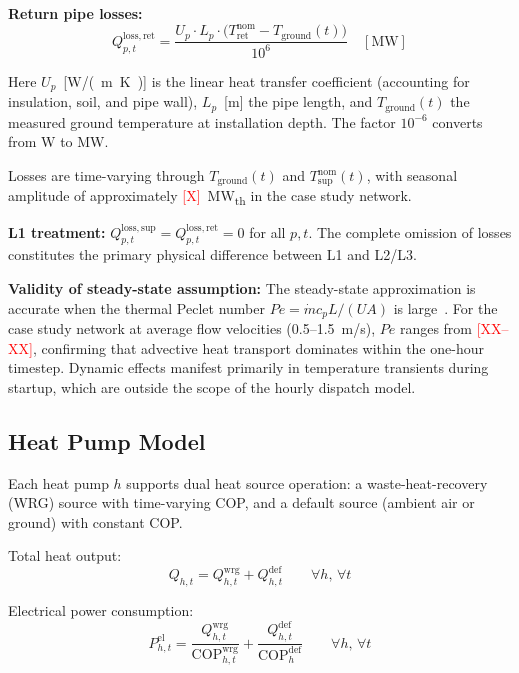 \documentclass[review,3p]{elsarticle}
\newcommand{\placeholder}[1]{\textcolor{red}{[#1]}}
\begin{document}
\textbf{Return pipe losses:}
\begin{equation}
Q_{p,t}^{\mathrm{loss,ret}} = \frac{U_p \cdot L_p \cdot
\big(T_{\mathrm{ret}}^{\mathrm{nom}} - T_{\mathrm{ground}}(t)\big)}{10^6}
\quad [\mathrm{MW}]
\label{eq:loss_return}
\end{equation}

Here $U_p$~[\si{W/(m.K)}] is the linear heat transfer coefficient
(accounting for insulation, soil, and pipe wall), $L_p$~[m] the pipe
length, and $T_{\mathrm{ground}}(t)$ the measured ground temperature at
installation depth. The factor $10^{-6}$ converts from \si{W} to \si{MW}.

Losses are time-varying through $T_{\mathrm{ground}}(t)$ and
$T_{\mathrm{sup}}^{\mathrm{nom}}(t)$, with seasonal amplitude of
approximately \placeholder{X}~MW\textsubscript{th} in the case study
network.

\textbf{L1 treatment:} $Q_{p,t}^{\mathrm{loss,sup}} =
Q_{p,t}^{\mathrm{loss,ret}} = 0$ for all $p, t$. The complete
omission of losses constitutes the primary physical difference
between L1 and L2/L3.

\textbf{Validity of steady-state assumption:} The steady-state
approximation is accurate when the thermal Peclet number
$Pe = \dot{m} c_p L / (U A)$ is large~\cite{vanderHeijde2017}.
For the case study network at average flow velocities (0.5--1.5~m/s),
$Pe$ ranges from \placeholder{XX--XX}, confirming that advective heat
transport dominates within the one-hour timestep. Dynamic effects
manifest primarily in temperature transients during startup, which are
outside the scope of the hourly dispatch model.

\subsection{Heat Pump Model}
\label{sec:model_hp}

Each heat pump $h$ supports dual heat source operation: a
waste-heat-recovery (WRG) source with time-varying COP, and a default
source (ambient air or ground) with constant COP.

Total heat output:
\begin{equation}
Q_{h,t} = Q_{h,t}^{\mathrm{wrg}} + Q_{h,t}^{\mathrm{def}}
\qquad \forall h,\, \forall t
\label{eq:hp_split}
\end{equation}

Electrical power consumption:
\begin{equation}
P_{h,t}^{\mathrm{el}} = \frac{Q_{h,t}^{\mathrm{wrg}}}{
\mathrm{COP}_{h,t}^{\mathrm{wrg}}}
+ \frac{Q_{h,t}^{\mathrm{def}}}{\mathrm{COP}_h^{\mathrm{def}}}
\qquad \forall h,\, \forall t
\label{eq:hp_pel}
\end{equation}
\end{document}
